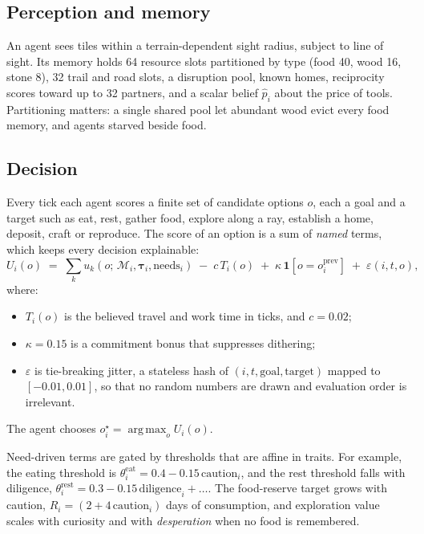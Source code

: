 \documentclass[11pt]{article}
\theoremstyle{definition}
\newcommand{\argmax}{\operatorname*{arg\,max}}
\newcommand{\1}{\mathbf{1}}
\begin{document}
\subsection{Perception and memory}
An agent sees tiles within a terrain-dependent sight radius, subject to line of sight. Its memory holds 64 resource slots partitioned by type (food 40, wood 16, stone 8), 32 trail and road slots, a disruption pool, known homes, reciprocity scores toward up to 32 partners, and a scalar belief $\hat p_i$ about the price of tools. Partitioning matters: a single shared pool let abundant wood evict every food memory, and agents starved beside food.

\subsection{Decision}
Every tick each agent scores a finite set of candidate options $o$, each a goal and a target such as eat, rest, gather food, explore along a ray, establish a home, deposit, craft or reproduce. The score of an option is a sum of \emph{named} terms, which keeps every decision explainable:
\begin{equation}
U_i(o) \;=\; \sum_{k} u_{k}(o;\,\mathcal{M}_i,\boldsymbol{\tau}_i,\text{needs}_i) \;-\; c\,T_i(o) \;+\; \kappa\,\1[o = o_i^{\text{prev}}] \;+\; \varepsilon(i,t,o),
\label{eq:utility}
\end{equation}
where:
\begin{itemize}
\item $T_i(o)$ is the believed travel and work time in ticks, and $c = 0.02$;
\item $\kappa=0.15$ is a commitment bonus that suppresses dithering;
\item $\varepsilon$ is tie-breaking jitter, a stateless hash of $(i,t,\text{goal},\text{target})$ mapped to $[-0.01, 0.01]$, so that no random numbers are drawn and evaluation order is irrelevant.
\end{itemize}
The agent chooses $o_i^\star = \argmax_o U_i(o)$.

Need-driven terms are gated by thresholds that are affine in traits. For example, the eating threshold is $\theta^{\text{eat}}_i = 0.4 - 0.15\,\text{caution}_i$, and the rest threshold falls with diligence, $\theta^{\text{rest}}_i = 0.3 - 0.15\,\text{diligence}_i + \dots$. The food-reserve target grows with caution, $R_i = (2 + 4\,\text{caution}_i)$ days of consumption, and exploration value scales with curiosity and with \emph{desperation} when no food is remembered.
\end{document}
